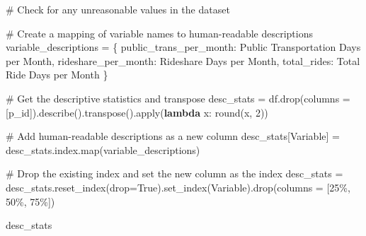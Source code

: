 \documentclass[
  letterpaper,
  DIV=11,
  numbers=noendperiod]{scrartcl}
\newenvironment{Shaded}{\begin{snugshade}}{\end{snugshade}}
\newcommand{\BuiltInTok}[1]{\textcolor[rgb]{0.00,0.23,0.31}{#1}}
\newcommand{\CommentTok}[1]{\textcolor[rgb]{0.37,0.37,0.37}{#1}}
\newcommand{\DecValTok}[1]{\textcolor[rgb]{0.68,0.00,0.00}{#1}}
\newcommand{\KeywordTok}[1]{\textcolor[rgb]{0.00,0.23,0.31}{\textbf{#1}}}
\newcommand{\NormalTok}[1]{\textcolor[rgb]{0.00,0.23,0.31}{#1}}
\newcommand{\OperatorTok}[1]{\textcolor[rgb]{0.37,0.37,0.37}{#1}}
\newcommand{\StringTok}[1]{\textcolor[rgb]{0.13,0.47,0.30}{#1}}
\newcommand{\VariableTok}[1]{\textcolor[rgb]{0.07,0.07,0.07}{#1}}
\begin{document}
\begin{Shaded}
\begin{Highlighting}[]
\CommentTok{\# Check for any unreasonable values in the dataset}

\CommentTok{\# Create a mapping of variable names to human{-}readable descriptions}
\NormalTok{variable\_descriptions }\OperatorTok{=}\NormalTok{ \{}
    \StringTok{\textquotesingle{}public\_trans\_per\_month\textquotesingle{}}\NormalTok{: }\StringTok{\textquotesingle{}Public Transportation Days per Month\textquotesingle{}}\NormalTok{,}
    \StringTok{\textquotesingle{}rideshare\_per\_month\textquotesingle{}}\NormalTok{: }\StringTok{\textquotesingle{}Rideshare Days per Month\textquotesingle{}}\NormalTok{,}
    \StringTok{\textquotesingle{}total\_rides\textquotesingle{}}\NormalTok{: }\StringTok{\textquotesingle{}Total Ride Days per Month\textquotesingle{}}
\NormalTok{\}}

\CommentTok{\# Get the descriptive statistics and transpose}
\NormalTok{desc\_stats }\OperatorTok{=}\NormalTok{ df.drop(columns }\OperatorTok{=}\NormalTok{ [}\StringTok{\textquotesingle{}p\_id\textquotesingle{}}\NormalTok{]).describe().transpose().}\BuiltInTok{apply}\NormalTok{(}\KeywordTok{lambda}\NormalTok{ x: }\BuiltInTok{round}\NormalTok{(x, }\DecValTok{2}\NormalTok{))}

\CommentTok{\# Add human{-}readable descriptions as a new column}
\NormalTok{desc\_stats[}\StringTok{\textquotesingle{}Variable\textquotesingle{}}\NormalTok{] }\OperatorTok{=}\NormalTok{ desc\_stats.index.}\BuiltInTok{map}\NormalTok{(variable\_descriptions)}

\CommentTok{\# Drop the existing index and set the new column as the index}
\NormalTok{desc\_stats }\OperatorTok{=}\NormalTok{ desc\_stats.reset\_index(drop}\OperatorTok{=}\VariableTok{True}\NormalTok{).set\_index(}\StringTok{\textquotesingle{}Variable\textquotesingle{}}\NormalTok{).drop(columns }\OperatorTok{=}\NormalTok{ [}\StringTok{\textquotesingle{}25\%\textquotesingle{}}\NormalTok{, }\StringTok{\textquotesingle{}50\%\textquotesingle{}}\NormalTok{, }\StringTok{\textquotesingle{}75\%\textquotesingle{}}\NormalTok{])}

\NormalTok{desc\_stats}
\end{Highlighting}
\end{Shaded}
\end{document}
